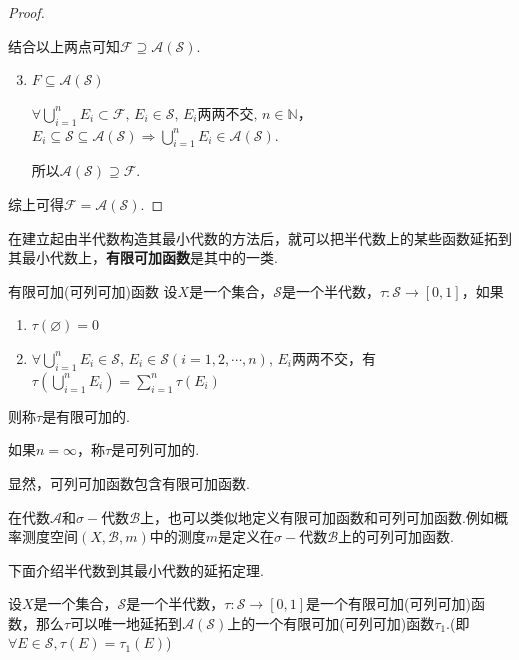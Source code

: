 \documentclass[lang=cn,a4paper,11pt,openany,scheme=chinese,twoside]{elegantbook}
\newcommand{\wideline}{\setlength{\lineskip}{\baselineskip-\ccwd}\setlength{\lineskiplimit}{2.5pt}}
\newcommand{\bluebf}[1]{\textcolor{structurecolor}{\textbf{#1}}}
\newcommand{\sigmaalg}{\sigma-\text{代数}}
\begin{document}
\begin{proof}
\begin{enumerate}[label=(\arabic*)]
\begin{enumerate}[label=(\roman*)]
        \end{enumerate}
    \end{enumerate}\par
    结合以上两点可知$\mathcal{F}\supseteq\mathcal{A}(\mathcal{S})$.
    \begin{enumerate}[label=(\arabic*)]
        \setcounter{enumi}{2}
        \item $F\subseteq\mathcal{A}(\mathcal{S})$\par
        $\forall \bigcup_{i=1}^n{E_i}\subset\mathcal{F},\, E_i\in\mathcal{S},\, E_i\text{两两不交},\,n\in\mathbb{N}$，$E_i\subseteq\mathcal{S}\subseteq\mathcal{A}(\mathcal{S})\Rightarrow \bigcup_{i=1}^n{E_i}\in\mathcal{A}(\mathcal{S})$.\par
        所以$\mathcal{A}(\mathcal{S})\supseteq\mathcal{F}$.
    \end{enumerate}\par
    综上可得$\mathcal{F}=\mathcal{A}(\mathcal{S})$.
\end{proof}
在建立起由半代数构造其最小代数的方法后，就可以把半代数上的某些函数延拓到其最小代数上，\bluebf{有限可加函数}是其中的一类.
\begin{definition}{有限可加(可列可加)函数}
    \wideline
    设$X$是一个集合，$\mathcal{S}$是一个半代数，$\tau:\mathcal{S}\to[0,1]$，如果
    \begin{enumerate}
        \item $\tau(\varnothing)=0$
        \item $\forall\bigcup_{i=1}^n{E_i}\in\mathcal{S},\, E_i\in\mathcal{S}(i=1,2,\cdots,n),\, E_i两两不交$，有$\tau\left(\bigcup_{i=1}^n{E_i}\right)=\sum_{i=1}^n{\tau(E_i)}$
    \end{enumerate}
    则称$\tau$是有限可加的.\par
    如果$n=\infty$，称$\tau$是可列可加的.
\end{definition}
显然，可列可加函数包含有限可加函数.\par
在代数$\mathcal{A}$和$\sigmaalg\mathcal{B}$上，也可以类似地定义有限可加函数和可列可加函数.例如概率测度空间$(X,\mathcal{B},m)$中的测度$m$是定义在$\sigmaalg\mathcal{B}$上的可列可加函数.\par
下面介绍半代数到其最小代数的延拓定理.\par
\begin{theorem}
    设$X$是一个集合，$\mathcal{S}$是一个半代数，$\tau:\mathcal{S}\to[0,1]$是一个有限可加(可列可加)函数，那么$\tau$可以唯一地延拓到$\mathcal{A}(\mathcal{S})$上的一个有限可加(可列可加)函数$\tau_1$.(即$\forall E\in\mathcal{S},\tau(E)=\tau_1(E)$)
\end{theorem}
\end{document}
